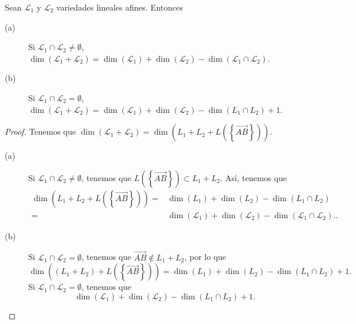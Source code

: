 \begin{ftheorem}
\normalfont Sean $\displaystyle \mathcal{L}_{1} $ y $\displaystyle \mathcal{L}_{2} $ variedades lineales afines. Entonces
\begin{description}
\item[(a)] Si $\displaystyle \mathcal{L}_{1} \cap \mathcal{L}_{2} \neq \emptyset $, $\displaystyle \dim\left(\mathcal{L}_{1} + \mathcal{L}_{2}\right) = \dim\left(\mathcal{L}_{1}\right) + \dim\left(\mathcal{L}_{2}\right) - \dim\left(\mathcal{L}_{1} \cap \mathcal{L}_{2}\right) $.
\item[(b)] Si $\displaystyle \mathcal{L}_{1} \cap \mathcal{L}_{2} = \emptyset $, $\displaystyle \dim\left(\mathcal{L}_{1} + \mathcal{L}_{2}\right) = \dim\left(\mathcal{L}_{1}\right) + \dim\left(\mathcal{L}_{2}\right) - \dim\left(L_{1} \cap L_{2}\right) + 1 $.
\end{description}
\end{ftheorem}
\begin{proof} Tenemos que $\displaystyle \dim\left(\mathcal{L}_{1} + \mathcal{L}_{2}\right) = \dim\left(L_{1} + L_{2} + L\left( \left\{ \overrightarrow{AB}\right\} \right)\right) $.
\begin{description}
	\item[(a)] Si $\displaystyle \mathcal{L}_{1} \cap \mathcal{L}_{2} \neq \emptyset $, tenemos que $\displaystyle L\left( \left\{ \overrightarrow{AB}\right\} \right) \subset L_{1} + L_{2}$. Así, tenemos que 
		\[
		\begin{split}
			\dim\left(L_{1} + L_{2} + L\left( \left\{ \overrightarrow{AB}\right\} \right)\right) = & \dim\left(L_{1}\right) + \dim\left(L_{2}\right) - \dim\left(L_{1} \cap L_{2}\right) \\
			= &  \dim\left(\mathcal{L}_{1}\right)+ \dim\left(\mathcal{L}_{2}\right) - \dim\left(\mathcal{L}_{1} \cap \mathcal{L}_{2}\right) . .
		\end{split}
		\]
	\item[(b)] Si $\displaystyle \mathcal{L}_{1} \cap \mathcal{L}_{2} = \emptyset $, tenemos que $\displaystyle \overrightarrow{AB} \not\in L_{1} + L_{2} $, por lo que 
		\[\dim\left(\left(L_{1}+L_{2}\right) + L\left( \left\{ \overrightarrow{AB}\right\} \right)\right) = \dim\left(L_{1}\right) + \dim\left(L_{2}\right) -\dim\left(L_{1}\cap L_{2}\right) + 1.\]
Si $\displaystyle \mathcal{L}_{1} \cap \mathcal{L}_{2} = \emptyset $, tenemos que 
\[\dim\left(\mathcal{L}_{1}\right) + \dim\left(\mathcal{L}_{2}\right) - \dim\left(L_{1}\cap L_{2}\right)+1 .\]
\end{description}
\end{proof}
